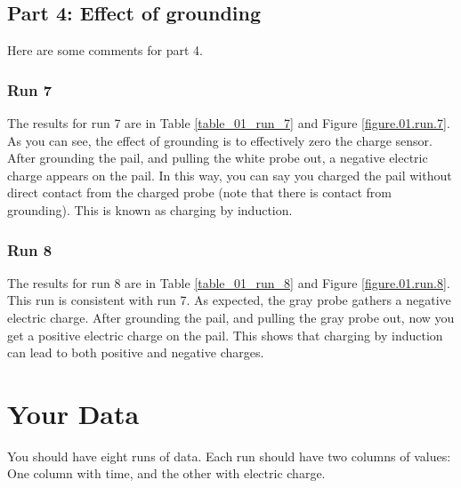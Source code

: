 \subsection{Part 4: Effect of grounding}
Here are some comments for part 4.
\subsubsection{Run 7}
The results for run 7 are in Table \ref{table_01_run_7} and Figure \ref{figure.01.run.7}. As you can see, the effect of grounding is to effectively zero the charge sensor. After grounding the pail, and pulling the white probe out, a negative electric charge appears on the pail. In this way, you can say you charged the pail without direct contact from the charged probe (note that there is contact from grounding). This is known as charging by induction.
\subsubsection{Run 8}
The results for run 8 are in Table \ref{table_01_run_8} and Figure \ref{figure.01.run.8}. This run is consistent with run 7. As expected, the gray probe gathers a negative electric charge. After grounding the pail, and pulling the gray probe out, now you get a positive electric charge on the pail. This shows that charging by induction can lead to both positive and negative charges.
\section{Your Data}
You should have eight runs of data. Each run should have two columns of values: One column with time, and the other with electric charge.
\newpage
